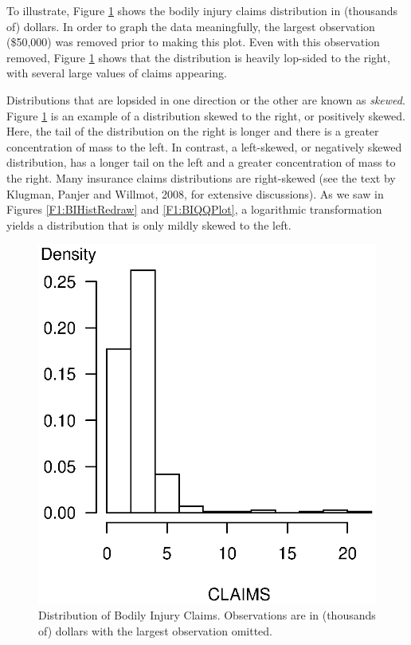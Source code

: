 To illustrate, Figure \ref{F1:BIOrig} shows the bodily injury claims
distribution in (thousands of) dollars. In order to graph the data
meaningfully, the largest observation (\$50,000) was removed prior
to making this plot. Even with this observation removed, Figure
\ref{F1:BIOrig} shows that the distribution is heavily lop-sided to
the right, with several large values of claims appearing.



Distributions that are lopsided in one direction or the other are
known as \emph{skewed}. Figure \ref{F1:BIOrig} is an example of a
distribution skewed to the right, or positively skewed. Here, the
tail of the distribution on the right is longer and there is a
greater concentration of mass to the left. In contrast, a
left-skewed, or negatively skewed distribution, has a longer tail on
the left and a greater concentration of mass to the right. Many
insurance claims distributions are right-skewed (see the text by
Klugman, Panjer and Willmot, 2008, for extensive discussions). As we
saw in Figures \ref{F1:BIHistRedraw} and \ref{F1:BIQQPlot}, a
logarithmic transformation yields a distribution that is only mildly
skewed to the left.


\setcounter{figure}{5}

\begin{figure}[htp]
  \begin{center}
    \includegraphics[width=.4\textwidth]
        {Chapter1/F1BIOrig.eps}
    \caption{\label{F1:BIOrig} \small Distribution of Bodily Injury Claims. Observations are in (thousands of)
dollars with the largest observation omitted.}
  \end{center}
\end{figure}


